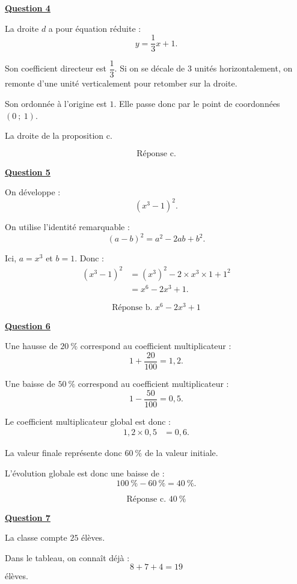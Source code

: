 			\medskip
			\textbf{\underline{Question 4}}
			
			\medskip
			La droite $d$ a pour équation réduite :
			\[
			y=\frac13x+1.
			\]
			
			Son coefficient directeur est $\dfrac13$. Si on se décale de 3 unités horizontalement, on remonte d'une unité verticalement pour retomber sur la droite.
			
			Son ordonnée à l'origine est $1$. Elle passe donc par le point de coordonnées $(0\ ;\ 1)$.
			
			La droite de la proposition c.
			
			\[
			\boxed{\text{Réponse c.}}
			\]
			
			\medskip
			\textbf{\underline{Question 5}}
			
			\medskip
			On développe :
			\[
			(x^3-1)^2.
			\]
			
			On utilise l'identité remarquable :
			\[
			(a-b)^2=a^2-2ab+b^2.
			\]
			
			Ici, $a=x^3$ et $b=1$. Donc :
			\begin{align*}
				(x^3-1)^2
				&=(x^3)^2-2\times x^3\times 1+1^2\\
				&=x^6-2x^3+1.
			\end{align*}
			
			\[
			\boxed{\text{Réponse b. }x^6-2x^3+1}
			\]
			
			\medskip
			\textbf{\underline{Question 6}}
			
			\medskip
			Une hausse de $20\ \%$ correspond au coefficient multiplicateur :
			\[
			1+\frac{20}{100}=1{,}2.
			\]
			
			Une baisse de $50\ \%$ correspond au coefficient multiplicateur :
			\[
			1-\frac{50}{100}=0{,}5.
			\]
			
			Le coefficient multiplicateur global est donc :
			\begin{align*}
				1{,}2\times 0{,}5&=0{,}6.
			\end{align*}
			
			La valeur finale représente donc $60\ \%$ de la valeur initiale.
			
			L'évolution globale est donc une baisse de :
			\[
			100\ \%-60\ \%=40\ \%.
			\]
			
			\[
			\boxed{\text{Réponse c. }40\ \%}
			\]
			
			\medskip
			\textbf{\underline{Question 7}}
			
			\medskip
			La classe compte $25$ élèves.
			
			Dans le tableau, on connaît déjà :
			\[
			8+7+4=19
			\]
			élèves.
			
